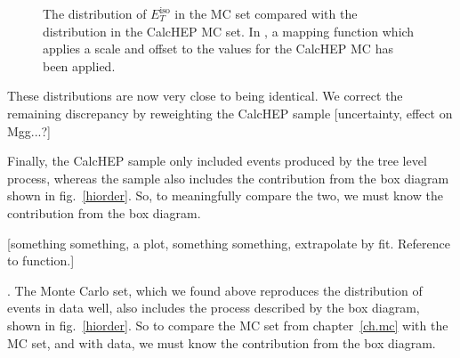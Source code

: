\begin{figure}[htp]
\begin{minipage}[b]{.49\textwidth}
\begin{infilsf} \tiny 

\end{infilsf}
\end{minipage}
\hfill
\begin{minipage}[b]{.49\textwidth}
\begin{infilsf} \tiny 

\end{infilsf}
\end{minipage}
\begin{minipage}[b]{.49\textwidth}
\end{minipage}\hfill
\begin{minipage}[b]{.49\textwidth}
\end{minipage}
\caption{The distribution of $E_T^\text{iso}$ in the \atlas{} MC set compared with the distribution in the CalcHEP MC set. In , a mapping function which applies a scale and offset to the values for the CalcHEP MC has been applied.}
\end{figure}

These distributions are now very close to being identical. We correct the remaining discrepancy by reweighting the CalcHEP sample [uncertainty, effect on Mgg...?]

Finally, the CalcHEP sample only included events produced by the tree level process, whereas the \atlas{} sample also includes the contribution from the box diagram shown in fig.~\ref{hiorder}. So, to meaningfully compare the two, we must know the contribution from the box diagram.

[something something, a plot, something something, extrapolate by fit. Reference to function.]




. The \atlas{} Monte Carlo set, which we found above reproduces the distribution of events in data well, also includes the process described by the box diagram, shown in fig.~\ref{hiorder}. So to compare the MC set from chapter~\ref{ch.mc} with the \atlas{} MC set, and with data, we must know the contribution from the box diagram. 